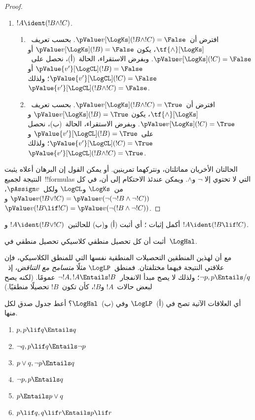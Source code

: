 \documentclass[../../../include/open-logic-section]{subfiles}
\begin{document}
\begin{proof}
\begin{enumerate}
    \item $!A \ident (!B \land !C)$.
    \begin{enumerate}
      \item افترض أن~$\pValue v[\LogKs](!B \land !C) = \False$.
      بحسب تعريف~$\tf{\land}[\LogKs]$، يكون
      $\pValue v[\LogKs](!B) = \False$ أو
      $\pValue v[\LogKs](!C) = \False$. وبفرض الاستقراء، الحالة~(أ)،
      نحصل على~$\pValue {v'}[\LogCL](!B) = \False$ أو
      $\pValue {v'}[\LogCL](!C) = \False$؛ ولذلك
      $\pValue {v'}[\LogCL](!B \land !C) = \False$.
      \item افترض أن~$\pValue v[\LogKs](!B \land !C) = \True$.
      بحسب تعريف~$\tf{\land}[\LogKs]$، يكون
      $\pValue v[\LogKs](!B) = \True$ و
      $\pValue v[\LogKs](!C) = \True$. وبفرض الاستقراء، الحالة~(ب)،
      نحصل على~$\pValue {v'}[\LogCL](!B) = \True$ و
      $\pValue {v'}[\LogCL](!C) = \True$؛ ولذلك
      $\pValue {v'}[\LogCL](!B \land !C) = \True$.
    \end{enumerate}
  \end{enumerate}

  الحالتان الأخريان مماثلتان، ونتركهما تمرينين. أو يمكن القول إن
  البرهان أعلاه يثبت النتيجة لجميع~!!{formula}s التي لا تحتوي إلا
  $\lnot$ و$\land$. ويمكن عندئذ الاحتكام إلى أن، في كل من~$\LogKs$
  و$\LogCL$ ولكل~$\pAssign v$،
  $\pValue v(!B \lor !C) = \pValue v(\lnot(\lnot!B \land \lnot !C))$
  و$\pValue v(!B \lif !C) = \pValue v(\lnot(!B \land \lnot !C))$.
\end{proof}

\begin{prob}
  أكمل إثبات ؛ أي أثبت (أ)
  و(ب) للحالتين~$!A \ident (!B \lor !C)$ و
  $!A \ident (!B \lif !C)$.
\end{prob}

\begin{prob}
أثبت أن كل تحصيل منطقي كلاسيكي تحصيل منطقي في~$\LogHal$.
\end{prob}

مع أن لهذين المنطقين التحصيلات المنطقية نفسها التي للمنطق الكلاسيكي،
فإن علاقتي النتيجة فيهما مختلفتان. فمنطق~$\LogLP$ مثلًا
\emph{متسامح مع التناقض}، إذ~$\lnot p, p \Entails/ q$؛ ولذلك لا يصح
مبدأ الانفجار~$\lnot !A, !A \Entails !B$ عمومًا. (لكنه يصح لبعض
حالات~$!A$ و$!B$، كأن تكون~$!B$ تحصيلًا منطقيًا.)

\begin{prob}
  أي العلاقات الآتية تصح في (أ)~$\LogLP$ وفي (ب)~$\LogHal$؟ أعط
  جدول صدق لكل منها.
  \begin{enumerate}
    \item $p, p \lif q \Entails q$
    \item $\lnot q, p \lif q \Entails \lnot p$
    \item $p \lor q, \lnot p \Entails q$
    \item $\lnot p, p \Entails q$
    \item $p \Entails p \lor q$
    \item $p \lif q, q\lif r \Entails p \lif r$
  \end{enumerate}
\end{prob}
\end{document}
